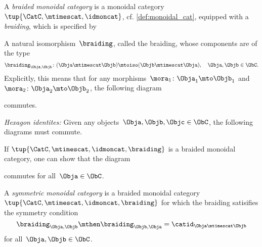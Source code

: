 \newpage


\begin{ctdefinition}
    \label{def:braided_moncat}
  A \emph{braided monoidal category} is a monoidal category~$\tup{\CatC,\mtimescat,\idmoncat}$,  cf. \cref{def:monoidal_cat}, equipped with a \emph{braiding}, which is specified by
  
  \constit
   \begin{compactenum}
   \item A natural isomorphism~$\braiding$, called the braiding, whose components are of the type
   \begin{equation*}
   \braiding_{\Obja,\Objb}\colon (\Obja\mtimescat \Objb)\mtoiso (\Objb\mtimescat \Obja), \quad \Obja,\Objb \in \ObC.
\end{equation*}
   Explicitly, this means that for any morphisms~$\mora_1\colon \Obja_1\mto \Objb_1$ and~$\mora_2\colon \Obja_2\mto \Objb_2$, the following diagram
    \begin{center}
    \end{center}
    commutes. 
   \end{compactenum}
  
  \condit
  \begin{compactenum}
    \item \emph{Hexagon identites:} Given any objects~$\Obja,\Objb,\Objc\in \ObC$, the following diagrams must commute.
  \end{compactenum}
    \begin{center}
    \end{center}
    \begin{center}
    \end{center}
\end{ctdefinition}

 \begin{remark} If $\tup{\CatC,\mtimescat,\idmoncat, \braiding}$ is a braided monoidal category, one can show that the diagram 
    \begin{center}
    \end{center}
    commutes for all~$\Obja \in \ObC$.
  \end{remark}

\begin{ctdefinition}
    \label{def:sym-mon-cat}
  A \emph{symmetric monoidal category} is a braided monoidal category~$\tup{\CatC,\mtimescat,\idmoncat, \braiding}$ for which the braiding satisifies the symmetry condition
 \begin{equation}
     \label{eq:braiding-symmetry}
  \braiding_{\Obja,\Objb} \mthen \braiding_{\Objb,\Obja} = \catid_{\Obja \mtimescat \Objb}
\end{equation}
  for all~$\Obja, \Objb \in \ObC$.
  \end{ctdefinition}
  
